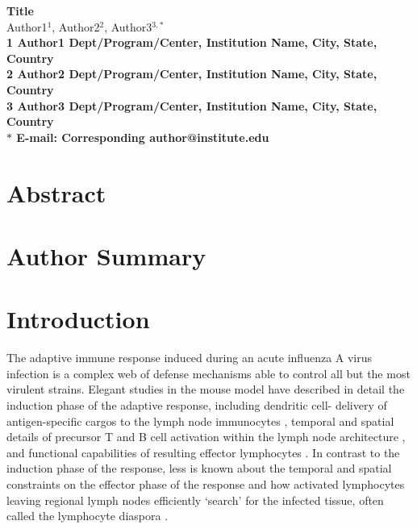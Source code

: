 \documentclass[10pt]{article}
\date{}
\begin{document}
\begin{flushleft}
{\Large
\textbf{Title}
}
\\
Author1$^{1}$, 
Author2$^{2}$, 
Author3$^{3,\ast}$
\\
\bf{1} Author1 Dept/Program/Center, Institution Name, City, State, Country
\\
\bf{2} Author2 Dept/Program/Center, Institution Name, City, State, Country
\\
\bf{3} Author3 Dept/Program/Center, Institution Name, City, State, Country
\\
$\ast$ E-mail: Corresponding author@institute.edu
\end{flushleft}



\section*{Abstract}



\section*{Author Summary}



\section*{Introduction}

The adaptive immune response induced during an acute influenza A virus infection is a complex web of defense mechanisms able to control all but the most virulent strains.  Elegant studies in the mouse model have described in detail the induction phase of the adaptive response, including dendritic cell- delivery of antigen-specific cargos to the lymph node immunocytes \cite{Maines2008, Saenz2010, Hatta2010}, temporal and spatial details of precursor T and B cell activation within the lymph node architecture \cite[Chapter 5]{Wormser2006a}, and functional capabilities of resulting effector lymphocytes \cite[Chapter 6]{Wormser2006a}.  In contrast to the induction phase of the response, less is known about the temporal and spatial constraints on the effector phase of the response and how activated lymphocytes leaving regional lymph nodes efficiently ‘search’ for the infected tissue, often called the lymphocyte diaspora \cite{Marshall2001}. 
\end{document}
